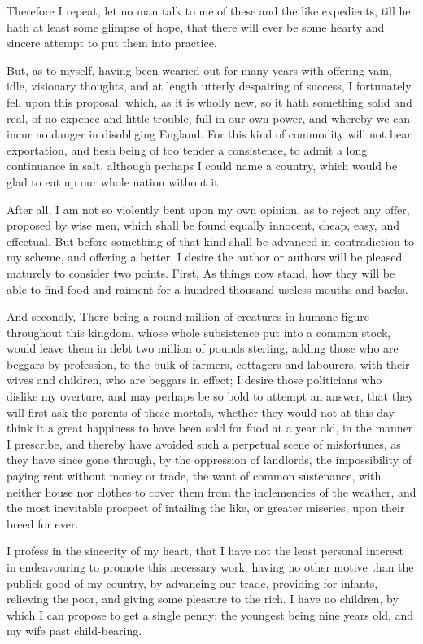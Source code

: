 Therefore I repeat, let no man talk to me of these and the like expedients, till he hath at least some glimpse of hope, that there will ever be some hearty and sincere attempt to put them into practice.\par

But, as to myself, having been wearied out for many years with offering vain, idle, visionary thoughts, and at length utterly despairing of success, I fortunately fell upon this proposal, which, as it is wholly new, so it hath something solid and real, of no expence and little trouble, full in our own power, and whereby we can incur no danger in disobliging England. For this kind of commodity will not bear exportation, and flesh being of too tender a consistence, to admit a long continuance in salt, although perhaps I could name a country, which would be glad to eat up our whole nation without it.\par

After all, I am not so violently bent upon my own opinion, as to reject any offer, proposed by wise men, which shall be found equally innocent, cheap, easy, and effectual. But before something of that kind shall be advanced in contradiction to my scheme, and offering a better, I desire the author or authors will be pleased maturely to consider two points. First, As things now stand, how they will be able to find food and raiment for a hundred thousand useless mouths and backs.\par

And secondly, There being a round million of creatures in humane figure throughout this kingdom, whose whole subsistence put into a common stock, would leave them in debt two million of pounds sterling, adding those who are beggars by profession, to the bulk of farmers, cottagers and labourers, with their wives and children, who are beggars in effect; I desire those politicians who dislike my overture, and may perhaps be so bold to attempt an answer, that they will first ask the parents of these mortals, whether they would not at this day think it a great happiness to have been sold for food at a year old, in the manner I prescribe, and thereby have avoided such a perpetual scene of misfortunes, as they have since gone through, by the oppression of landlords, the impossibility of paying rent without money or trade, the want of common sustenance, with neither house nor clothes to cover them from the inclemencies of the weather, and the most inevitable prospect of intailing the like, or greater miseries, upon their breed for ever.\par

I profess in the sincerity of my heart, that I have not the least personal interest in endeavouring to promote this necessary work, having no other motive than the publick good of my country, by advancing our trade, providing for infants, relieving the poor, and giving some pleasure to the rich. I have no children, by which I can propose to get a single penny; the youngest being nine years old, and my wife past child-bearing.\par

\endgroup
